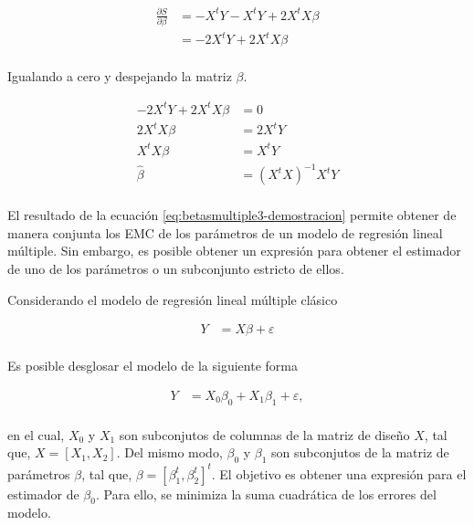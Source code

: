 \documentclass[
  11pt,
]{book}
\theoremstyle{definition}
\theoremstyle{definition}
\theoremstyle{definition}
\theoremstyle{definition}
\theoremstyle{remark}
\begin{document}
\begin{equation}
\begin{split}
\frac{\partial S}{\partial \beta} &= - X^tY - X^tY + 2X^tX\beta\\
&= - 2X^tY + 2X^tX\beta\\
\end{split}
\label{eq:betasmultiple2-demostracion}
\end{equation}

Igualando a cero y despejando la matriz \(\beta\).

\begin{equation}
\begin{split}
- 2X^tY + 2X^tX\beta &= 0\\
2X^tX\beta &= 2X^tY\\
X^tX\beta &= X^tY\\
\widehat{\beta} &= (X^tX)^{-1}X^tY\\
\end{split}
\label{eq:betasmultiple3-demostracion}
\end{equation}

El resultado de la ecuación \eqref{eq:betasmultiple3-demostracion} permite obtener de manera conjunta los EMC de los parámetros de un modelo de regresión lineal múltiple. Sin embargo, es posible obtener un expresión para obtener el estimador de uno de los parámetros o un subconjunto estricto de ellos.

Considerando el modelo de regresión lineal múltiple clásico

\begin{equation}
\begin{split}
Y &= X\beta + \varepsilon\\
\end{split}
\label{eq:RLM-clasico}
\end{equation}

Es posible desglosar el modelo de la siguiente forma

\begin{equation}
\begin{split}
Y &= X_0\beta_0 + X_1\beta_1 + \varepsilon,\\
\end{split}
\label{eq:RLM-clasico2}
\end{equation}

en el cual, \(X_0\) y \(X_1\) son subconjutos de columnas de la matriz de diseño \(X\), tal que, \(X = [X_1,X_2]\). Del mismo modo, \(\beta_0\) y \(\beta_1\) son subconjutos de la matriz de parámetros \(\beta\), tal que, \(\beta = [\beta_1^t,\beta_2^t]^t\). El objetivo es obtener una expresión para el estimador de \(\beta_0\). Para ello, se minimiza la suma cuadrática de los errores del modelo.
\end{document}

